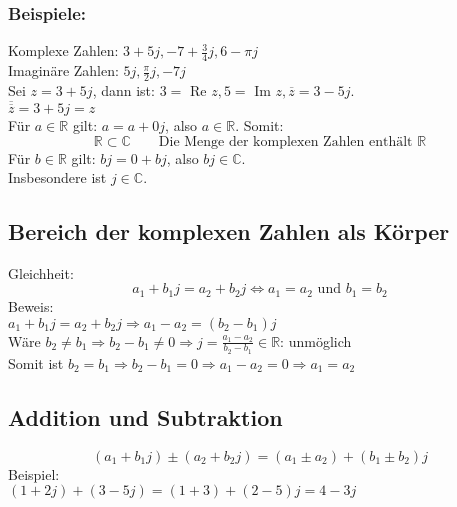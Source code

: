 \subsubsection{Beispiele:}
Komplexe Zahlen: $3 + 5 j, -7 + \frac{3}{4} j, 6 - \pi j$\\
Imaginäre Zahlen: $5 j, \frac{\pi}{2} j, -7 j$\\
Sei $z = 3 + 5 j$, dann ist: $3 =$ Re $z, 5 =$ Im $z, \overline{z} = 3 - 5 j$. \\
$\overline{\overline{z}} = 3 + 5 j = z$\\
Für $a \in \mathbb{R}$ gilt: $a = a + 0 j$, also $a \in \mathbb{R}$. Somit: 
\[ \boxed{\mathbb{R} \subset \mathbb{C}} \qquad \text{Die Menge der komplexen Zahlen enthält $\mathbb{R}$} \]
Für $b \in \mathbb{R}$ gilt: $b j = 0 + b j$, also $b j \in \mathbb{C}$. \\
Insbesondere ist $j \in \mathbb{C}$. 

\subsection{Bereich der komplexen Zahlen als Körper}
Gleichheit: 
\[ \boxed{a_1 + b_1 j = a_2 + b_2 j \Leftrightarrow a_1 = a_2\text{ und }b_1 = b_2} \]
Beweis: \\
$a_1 + b_1 j = a_2 + b_2 j \Rightarrow a_1 - a_2 = (b_2 - b_1) j$\\
Wäre $b_2 \neq b_1 \Rightarrow b_2 - b_1 \neq 0 \Rightarrow j = \frac{a_1 - a_2}{b_2 - b_1} \in \mathbb{R}$: unmöglich\\
Somit ist $b_2 = b_1 \Rightarrow b_2 - b_1 = 0 \Rightarrow a_1 - a_2 = 0 \Rightarrow a_1 = a_2$

\subsection{Addition und Subtraktion}
\[ \boxed{(a_1 + b_1 j) \pm (a_2 + b_2 j) = (a_1 \pm a_2) + (b_1 \pm b_2) j} \]
Beispiel: \\
$(1 + 2 j) + (3 - 5 j) = (1 + 3) + (2 - 5) j = 4 - 3 j $
